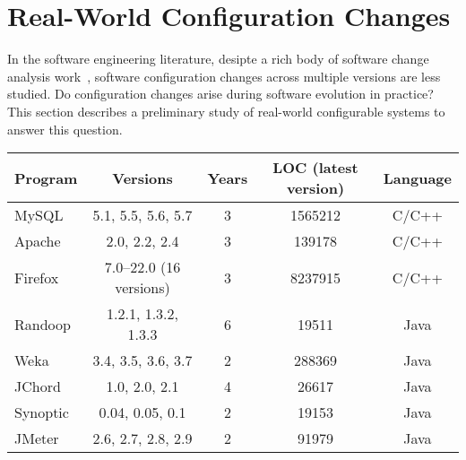 \section{Real-World Configuration Changes}
\label{sec:study}

In the software engineering literature, desipte a rich body of
software change analysis work~\cite{STVR:STVR1475, Dagenais:2008, Tao:2012:SEU}, 
software configuration changes across multiple
versions are less studied. Do configuration
changes arise during software evolution in practice?
This section describes a preliminary study of
\studysubjnum  real-world configurable systems to answer
this question.



\begin{table}[t]
\vspace{1mm}
\centering
\small{
\setlength{\tabcolsep}{.40\tabcolsep}
\begin{tabular}{|l||c|c|c|c|}
\hline
 Program & Versions & Years & LOC (latest version)  & Language\\
 \hline
 \hline
 MySQL & 5.1, 5.5, 5.6, 5.7 & 3 &1565212& C/C++\\
 Apache& 2.0, 2.2, 2.4 & 3  & 139178 &C/C++\\
 Firefox& 7.0--22.0 (16 versions) & 3  & 8237915&C/C++\\
 Randoop & 1.2.1, 1.3.2, 1.3.3 & 6 & 19511   &Java\\
 Weka & 3.4, 3.5, 3.6, 3.7  & 2  & 288369 &Java\\
 JChord & 1.0, 2.0, 2.1 &  4 & 26617  &Java\\
 Synoptic & 0.04, 0.05, 0.1 & 2   & 19153 &Java\\
 JMeter & 2.6, 2.7, 2.8, 2.9& 2   & 91979 &Java\\
\hline
\end{tabular}
}
\vspace{-2mm}
\end{table}


